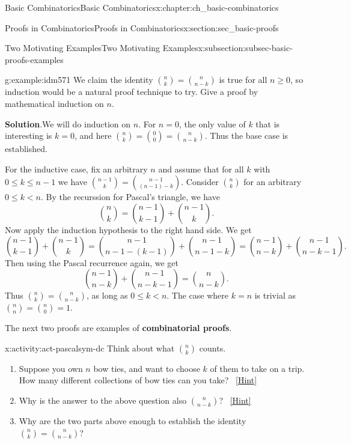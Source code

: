 \documentclass[oneside,10pt,]{book}
\newcommand{\terminology}[1]{\textbf{#1}}
\numberwithin{equation}{chapter}
\newcommand{\lt}{<}
\begin{document}
\begin{chapterptx}{Basic Combinatorics}{}{Basic Combinatorics}{}{}{x:chapter:ch_basic-combinatorics}
\begin{sectionptx}{Proofs in Combinatorics}{}{Proofs in Combinatorics}{}{}{x:section:sec_basic-proofs}
\begin{subsectionptx}{Two Motivating Examples}{}{Two Motivating Examples}{}{}{x:subsection:subsec-basic-proofs-examples}
\begin{example}{}{g:example:idm571}%
We claim the identity \(\binom{n}{k} = \binom{n}{n-k}\) is true for all \(n \ge 0\), so induction would be a natural proof technique to try.  Give a proof by mathematical induction on \(n\).%
\par\smallskip%
\noindent\textbf{Solution}.\hypertarget{g:solution:idm577}{}\quad{}We will do induction on \(n\).  For \(n = 0\), the only value of \(k\) that is interesting is \(k=0\), and here \(\binom{n}{k} = \binom{0}{0} = \binom{n}{n-k}\).  Thus the base case is established.%
\par
For the inductive case, fix an arbitrary \(n\) and assume that for all \(k\) with \(0 \le k \le n-1\) we have \(\binom{n-1}{k} = \binom{n-1}{(n-1)-k}\).  Consider \(\binom{n}{k}\) for an arbitrary \(0 \le k \lt n\).  By the recurssion for Pascal's triangle, we have%
\begin{equation*}
\binom{n}{k} = \binom{n-1}{k-1} + \binom{n-1}{k}.
\end{equation*}
Now apply the induction hypothesis to the right hand side.  We get%
\begin{equation*}
\binom{n-1}{k-1} + \binom{n-1}{k} = \binom{n-1}{n-1-(k-1)} + \binom{n-1}{n-1 -k} = \binom{n-1}{n-k} + \binom{n-1}{n-k-1}.
\end{equation*}
Then using the Pascal recurrence again, we get%
\begin{equation*}
\binom{n-1}{n-k} + \binom{n-1}{n-k-1} = \binom{n}{n-k}.
\end{equation*}
Thus \(\binom{n}{k} = \binom{n}{n-k}\), as long as \(0 \le k \lt n\).  The case where \(k = n\) is trivial as \(\binom{n}{n} = \binom{n}{0} = 1\).%
\end{example}
The next two proofs are examples of \terminology{combinatorial proofs}.%
\begin{activity}{}{x:activity:act-pascalsym-dc}%
Think about what \(\binom{n}{k}\) counts.%
\begin{enumerate}[font=\bfseries,label=(\alph*),ref=\alph*]
\item{}Suppose you own \(n\) bow ties, and want to choose \(k\) of them to take on a trip.  How many different collections of bow ties can you take?%
\qquad~\hfill{\tiny\hyperlink{g:hint:idm609-back}{[Hint]}}\item{}Why is the answer to the above question also \(\binom{n}{n-k}\)?%
\qquad~\hfill{\tiny\hyperlink{g:hint:idm620-back}{[Hint]}}\item{}Why are the two parts above enough to establish the identity \(\binom{n}{k} = \binom{n}{n-k}\)?%

\end{enumerate}
\end{activity}
\end{subsectionptx}
\end{sectionptx}
\end{chapterptx}
\end{document}
